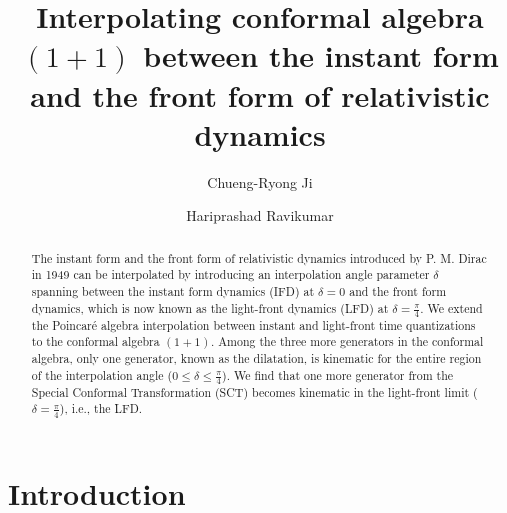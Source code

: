 \documentclass[%
 reprint,
superscriptaddress,
 amsmath,amssymb,
 aps,
]{revtex4-2}
\begin{document}

\title{Interpolating conformal algebra $(1+1)$ between the instant form
and the front form of relativistic dynamics}

\author{Chueng-Ryong Ji}

\author{Hariprashad Ravikumar}


\begin{abstract}
{\color{blue} The instant form and the front form of relativistic dynamics introduced by P. M. Dirac in 1949 can be interpolated by introducing an interpolation angle parameter $\delta$ spanning between the instant form dynamics (IFD) at $\delta=0$ and the front form dynamics, which is now known as the light-front dynamics (LFD) at $\delta=\frac{\pi}{4}$. We extend the Poincar\'e algebra interpolation between instant and light-front time quantizations to the conformal algebra $(1+1)$. Among the three more generators in the conformal algebra, only one generator, known as the dilatation, is kinematic for the entire region of the interpolation angle ($0\leq\delta\leq\frac{\pi}{4}$). We find that one more generator from the Special Conformal Transformation (SCT) becomes kinematic in the light-front limit ($\delta=\frac{\pi}{4}$), i.e., the LFD.} %
\end{abstract}
\maketitle


\section{Introduction}
\label{sec:introduction}
\end{document}
